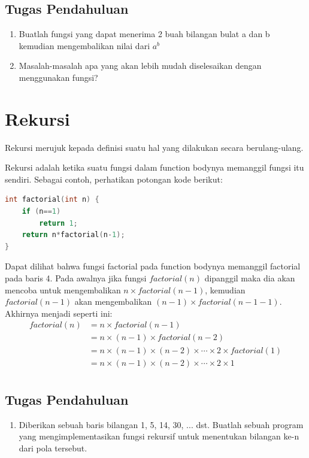 \subsection{Tugas Pendahuluan}
\begin{enumerate}
    \item Buatlah fungsi yang dapat menerima 2 buah bilangan bulat a dan b kemudian mengembalikan nilai dari $a^b$
    \item Masalah-masalah apa yang akan lebih mudah diselesaikan dengan menggunakan fungsi?
\end{enumerate}

\section{Rekursi}
Rekursi merujuk kepada definisi suatu hal yang dilakukan secara berulang-ulang.

Rekursi adalah ketika suatu fungsi dalam function bodynya memanggil fungsi itu sendiri.
Sebagai contoh, perhatikan potongan kode berikut:
\begin{lstlisting}[language=c,caption = Factorial dengan rekursi,label=lst:recursionexample01]
int factorial(int n) {
    if (n==1)
        return 1;
    return n*factorial(n-1);
}
\end{lstlisting}
Dapat dilihat bahwa fungsi factorial pada function bodynya memanggil factorial pada baris 4.
Pada awalnya jika fungsi $factorial(n)$ dipanggil maka dia akan mencoba untuk mengembalikan
$n\times factorial(n-1)$, kemudian $factorial(n-1)$ akan mengembalikan $(n-1)\times factorial(n-1-1)$.
Akhirnya menjadi seperti ini:
\begin{equation*}
    \begin{split}
        factorial(n)& = n \times factorial(n-1)\\
        & = n \times (n-1) \times factorial(n-2)\\
        & = n \times (n-1) \times (n-2) \times \cdots \times 2 \times factorial(1)\\
        & = n \times (n-1) \times (n-2) \times \cdots \times 2 \times 1\\
    \end{split}
\end{equation*}

\subsection{Tugas Pendahuluan}
\begin{enumerate}
    \item Diberikan sebuah baris bilangan 1, 5, 14, 30, ... dst. Buatlah sebuah program yang mengimplementasikan fungsi rekursif untuk menentukan bilangan ke-n dari pola tersebut.
\end{enumerate}